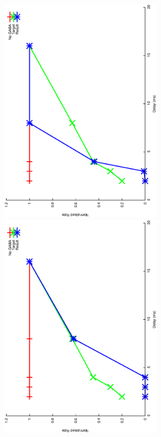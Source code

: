 \documentclass{article}
\begin{document}
\includegraphics[keepaspectratio=true,angle=-90,width=0.6\textwidth]{DS_ClickRecovery_result.8.eps}\clearpage
\includegraphics[keepaspectratio=true,angle=-90,width=0.6\textwidth]{DS_ClickRecovery_result.9.eps}\clearpage
\end{document}
